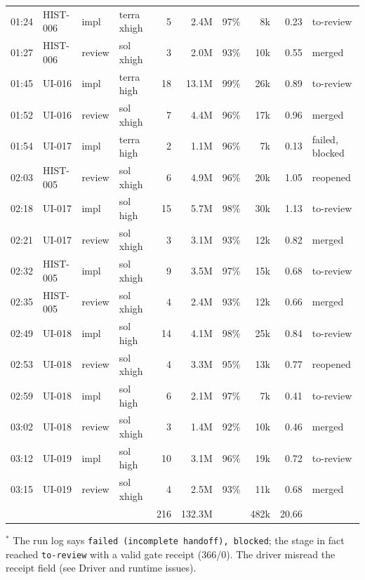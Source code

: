 \documentclass[11pt,a4paper]{article}
\begin{document}
{\begin{tabularx}{\linewidth}{@{}llllrrrrrX@{}}
01:24 & HIST-006 & impl & terra xhigh & 5 & 2.4M & 97\% & 8k & 0.23 & to-review \\
01:27 & HIST-006 & review & sol xhigh & 3 & 2.0M & 93\% & 10k & 0.55 & merged \\
01:45 & UI-016 & impl & terra high & 18 & 13.1M & 99\% & 26k & 0.89 & to-review \\
01:52 & UI-016 & review & sol xhigh & 7 & 4.4M & 96\% & 17k & 0.96 & merged \\
01:54 & UI-017 & impl & terra high & 2 & 1.1M & 96\% & 7k & 0.13 & failed, blocked \\
02:03 & HIST-005 & review & sol xhigh & 6 & 4.9M & 96\% & 20k & 1.05 & reopened \\
02:18 & UI-017 & impl & sol high & 15 & 5.7M & 98\% & 30k & 1.13 & to-review \\
02:21 & UI-017 & review & sol xhigh & 3 & 3.1M & 93\% & 12k & 0.82 & merged \\
02:32 & HIST-005 & impl & sol xhigh & 9 & 3.5M & 97\% & 15k & 0.68 & to-review \\
02:35 & HIST-005 & review & sol xhigh & 4 & 2.4M & 93\% & 12k & 0.66 & merged \\
02:49 & UI-018 & impl & sol high & 14 & 4.1M & 98\% & 25k & 0.84 & to-review \\
02:53 & UI-018 & review & sol xhigh & 4 & 3.3M & 95\% & 13k & 0.77 & reopened \\
02:59 & UI-018 & impl & sol high & 6 & 2.1M & 97\% & 7k & 0.41 & to-review \\
03:02 & UI-018 & review & sol xhigh & 3 & 1.4M & 92\% & 10k & 0.46 & merged \\
03:12 & UI-019 & impl & sol high & 10 & 3.1M & 96\% & 19k & 0.72 & to-review \\
03:15 & UI-019 & review & sol xhigh & 4 & 2.5M & 93\% & 11k & 0.68 & merged \\
\midrule
 & & & & 216 & 132.3M & & 482k & 20.66 & \\
\bottomrule
\end{tabularx}
}

\noindent$^{*}$ The run log says \texttt{failed (incomplete handoff), blocked}; the stage in fact
reached \texttt{to-review} with a valid gate receipt (366/0). The driver misread the receipt
field (see Driver and runtime issues).
\end{document}
